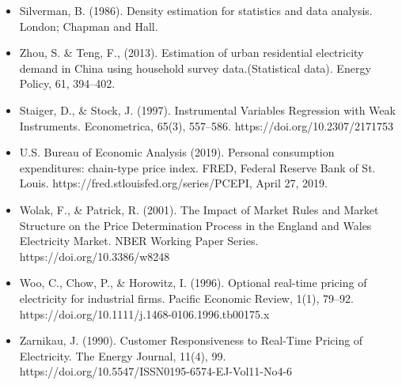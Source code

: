 \documentclass[aspectratio=169]{beamer}
\begin{document}
\begin{frame}[allowframebreaks]
\begin{itemize}
\item Silverman, B. (1986). Density estimation for statistics and data analysis. London; Chapman and Hall.

\item Zhou, S. \& Teng, F., (2013). Estimation of urban residential electricity demand in China using household survey data.(Statistical data). Energy Policy, 61, 394–402.

\item Staiger, D., \& Stock, J. (1997). Instrumental Variables Regression with Weak Instruments. Econometrica, 65(3), 557–586. https://doi.org/10.2307/2171753

\item U.S. Bureau of Economic Analysis (2019). Personal consumption expenditures: chain-type price index. FRED, Federal Reserve Bank of St. Louis. https://fred.stlouisfed.org/series/PCEPI, April 27, 2019.

\item Wolak, F., \& Patrick, R. (2001). The Impact of Market Rules and Market Structure on the Price Determination Process in the England and Wales Electricity Market. NBER Working Paper Series. https://doi.org/10.3386/w8248

\item Woo, C., Chow, P., \& Horowitz, I. (1996). Optional real-time pricing of electricity for industrial firms. Pacific Economic Review, 1(1), 79–92. https://doi.org/10.1111/j.1468-0106.1996.tb00175.x

\item Zarnikau, J. (1990). Customer Responsiveness to Real-Time Pricing of Electricity. The Energy Journal, 11(4), 99. https://doi.org/10.5547/ISSN0195-6574-EJ-Vol11-No4-6

\end{itemize}

\end{frame}
\end{document}
